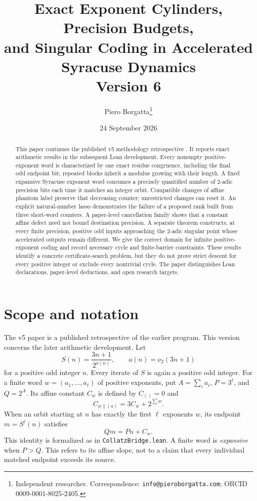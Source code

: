 \documentclass[11pt,a4paper]{article}
\title{Exact Exponent Cylinders, Precision Budgets,\\
  and Singular Coding in Accelerated Syracuse Dynamics\\
  \large Version 6}
\author{Piero Borgatta\thanks{Independent researcher. Correspondence:
\texttt{info@pieroborgatta.com}; ORCID 0009-0001-8025-2405.}}
\date{24 September 2026}
\newcommand{\ttbr}[1]{\texttt{\seqsplit{#1}}}
\newcommand{\nuTwo}{\nu_2}
\theoremstyle{definition}
\begin{document}
\maketitle

\begin{abstract}
This paper continues the published v5 methodology
retrospective \cite{borgatta_v5}. It reports exact arithmetic results in the
subsequent Lean development. Every nonempty positive-exponent word is
characterized by one exact residue congruence, including the final odd
endpoint bit; repeated blocks inherit a modulus growing with their length.
A fixed expansive Syracuse exponent word
consumes a precisely quantified number of $2$-adic precision bits each
time it matches an integer orbit. Compatible changes of affine phantom
label preserve that decreasing counter; unrestricted changes can reset it.
An explicit natural-number lasso demonstrates the failure of a proposed
rank built from three short-word counters. A paper-level cancellation
family shows that a constant affine defect need not bound destination
precision. A separate theorem constructs,
at every finite precision, positive odd inputs approaching the $2$-adic
singular point whose accelerated outputs remain different. We give the
correct domain for infinite positive-exponent coding and record necessary
cycle and finite-barrier constraints. These results identify a concrete
certificate-search problem, but they do not prove strict descent for every
positive integer or exclude every nontrivial cycle. The paper distinguishes
Lean declarations, paper-level deductions, and open research targets.
\end{abstract}

\begingroup\small
\tableofcontents
\endgroup

\section{Scope and notation}

The v5 paper \cite{borgatta_v5} is a published retrospective of the
earlier program. This version concerns the later arithmetic
development. Let
\[
  S(n)=\frac{3n+1}{2^{a(n)}},\qquad
  a(n)=\nuTwo(3n+1)
\]
for a positive odd integer $n$. Every iterate of $S$ is again a positive
odd integer. For a finite word $w=(a_1,\ldots,a_\ell)$ of positive
exponents, put $A=\sum_i a_i$, $P=3^\ell$, and $Q=2^A$. Its affine
constant $C_w$ is defined by $C_{()}=0$ and
\[
  C_{w\mathbin{\|}(a)}=3C_w+2^{\sum w}.
\]
When an orbit starting at $n$ has exactly the first $\ell$ exponents
$w$, its endpoint $m=S^\ell(n)$ satisfies
\begin{equation}\label{eq:affine}
  Qm=Pn+C_w.
\end{equation}
This identity is formalized as
\ttbr{evalSyracuseWord\_mul\_pow\_sum\_eq\_affine\_of\_matches}
in \texttt{CollatzBridge.lean}. A finite word is \emph{expansive} when
$P>Q$. This refers to its affine slope, not to a claim that every
individual matched endpoint exceeds its source.
\end{document}
